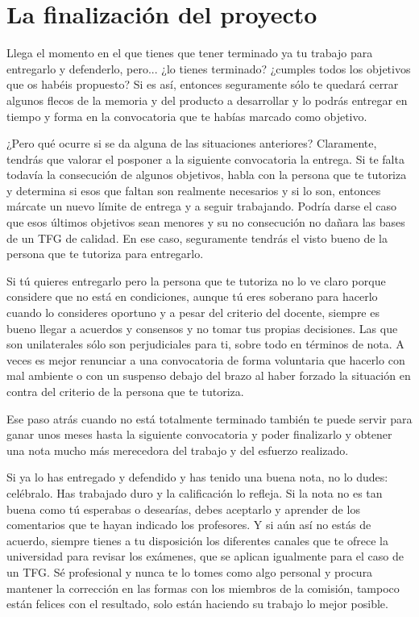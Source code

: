 \section{La finalización del proyecto}

Llega el momento en el que tienes que tener terminado ya tu trabajo para entregarlo y defenderlo, pero... ¿lo tienes terminado? ¿cumples todos los objetivos que os habéis propuesto? Si es así, entonces seguramente sólo te quedará cerrar algunos flecos de la memoria y del producto a desarrollar y lo podrás entregar en tiempo y forma en la convocatoria que te habías marcado como objetivo.

¿Pero qué ocurre si se da alguna de las situaciones anteriores? Claramente, tendrás que valorar el posponer a la siguiente convocatoria la entrega. Si te falta todavía la consecución de algunos objetivos, habla con la persona que te tutoriza y determina si esos que faltan son realmente necesarios y si lo son, entonces márcate un nuevo límite de entrega y a seguir trabajando. Podría darse el caso que esos últimos objetivos sean menores y su no consecución no dañara las bases de un TFG de calidad. En ese caso, seguramente tendrás el visto bueno de la persona que te tutoriza para entregarlo. 

Si tú quieres entregarlo pero la persona que te tutoriza no lo ve claro porque considere que no está en condiciones, aunque tú eres soberano para hacerlo cuando lo consideres oportuno y a pesar del criterio del docente, siempre es bueno llegar a acuerdos y consensos y no tomar tus propias decisiones. Las que son unilaterales sólo son perjudiciales para ti, sobre todo en términos de nota. A veces es mejor renunciar a una convocatoria de forma voluntaria que hacerlo con mal ambiente o con un suspenso debajo del brazo al haber forzado la situación en contra del criterio de la persona que te tutoriza. 

Ese paso atrás cuando no está totalmente terminado también te puede servir para ganar unos meses hasta la siguiente convocatoria y poder finalizarlo y obtener una nota mucho más merecedora del trabajo y del esfuerzo realizado. 

Si ya lo has entregado y defendido y has tenido una buena nota, no lo dudes: celébralo. Has trabajado duro y la calificación lo refleja. Si la nota no es tan buena como tú esperabas o desearías, debes aceptarlo y aprender de los comentarios que te hayan indicado los profesores.  Y si aún así no estás de acuerdo, siempre tienes a tu disposición los diferentes canales que  te ofrece la universidad para revisar los exámenes, que se aplican igualmente para el caso de un TFG. Sé profesional y nunca te lo tomes como algo personal y procura mantener la corrección en las formas con los miembros de la comisión, tampoco están felices con el resultado, solo están haciendo su trabajo lo mejor posible. 

